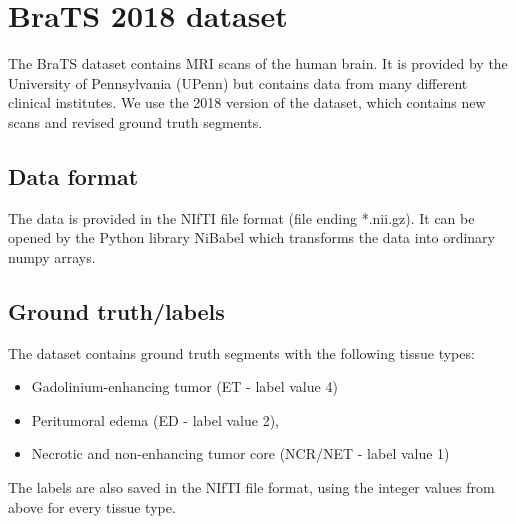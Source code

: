 \section{BraTS 2018 dataset}
The BraTS dataset \cite{menze2015multimodal} contains MRI scans of the human brain. It is provided by the University of Pennsylvania (UPenn) but contains data from many different clinical institutes.
We use the 2018 version of the dataset, which contains new scans and revised ground truth segments.

\subsection{Data format}
The data is provided in the NIfTI file format (file ending *.nii.gz). It can be opened by the Python library NiBabel\cite{nibabel} which transforms the data into ordinary numpy arrays.

\subsection{Ground truth/labels}
The dataset contains ground truth segments with the following tissue types:

\begin{itemize}
    \item Gadolinium-enhancing tumor (ET - label value 4)
    \item Peritumoral edema (ED - label value 2),
    \item Necrotic and non-enhancing tumor core (NCR/NET - label value 1)
\end{itemize}

The labels are also saved in the NIfTI file format, using the integer values from above for every tissue type.
